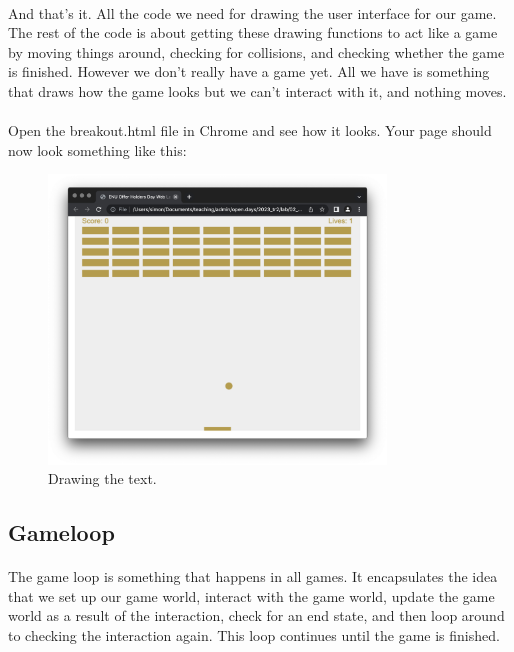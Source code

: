 \documentclass[10pt, a4paper, oneside]{article}
\begin{document}
\paragraph{} And that's it. All the code we need for drawing the user interface for our game. The rest of the code is about getting these drawing functions to act like a game by moving things around, checking for collisions, and checking whether the game is finished. However we don't really have a game yet. All we have is something that draws how the game looks but we can't interact with it, and nothing moves.

\paragraph{} Open the breakout.html file in Chrome and see how it looks. Your page should now look something like this:

\begin{figure}[H]
\centering
\includegraphics[width=0.8\textwidth]{images/02_drawing+d_draw_text.png}
\caption{Drawing the text.}
\label{fig:02_drawing+d_draw_text}
\end{figure}



\subsection{Gameloop}

\paragraph{} The game loop is something that happens in all games. It encapsulates the idea that we set up our game world, interact with the game world, update the game world as a result of the interaction, check for an end state, and then loop around to checking the interaction again. This loop continues until the game is finished.
\end{document}
